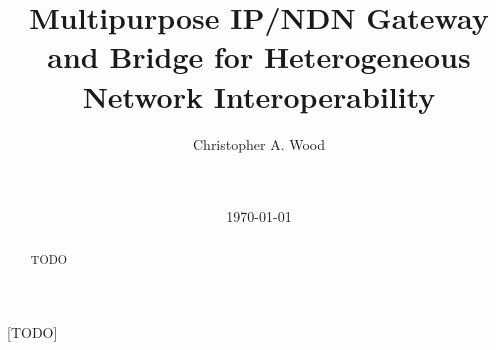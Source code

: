 \documentclass{sigcomm}
\begin{document}
\title{Multipurpose IP/NDN Gateway and Bridge for Heterogeneous Network Interoperability}

\author{
\alignauthor
Christopher A. Wood\\
       \\
       \\
}

\date{\today}

\maketitle
\begin{abstract}
TODO
\end{abstract}

[TODO]




% 

% 
% 
% 




\end{document}
